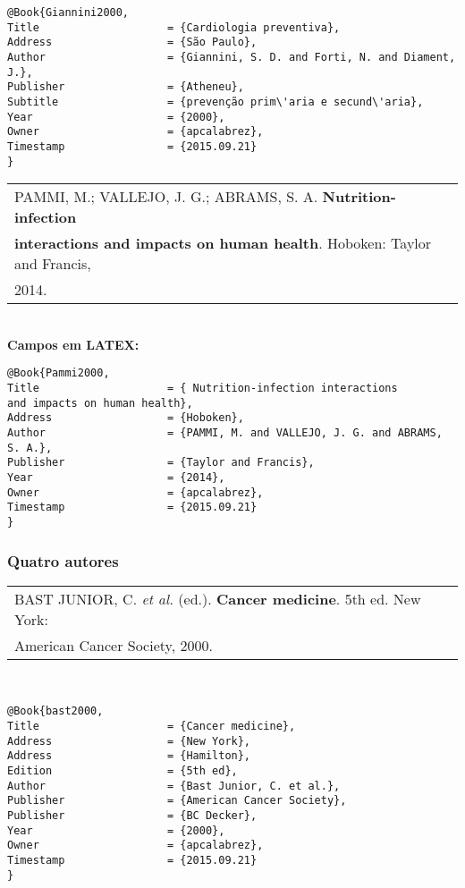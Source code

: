 \begin{verbatim}
@Book{Giannini2000,
Title                    = {Cardiologia preventiva},
Address                  = {São Paulo},
Author                   = {Giannini, S. D. and Forti, N. and Diament, 
J.},
Publisher                = {Atheneu},
Subtitle                 = {prevenção prim\'aria e secund\'aria},
Year                     = {2000},
Owner                    = {apcalabrez},
Timestamp                = {2015.09.21}
}
\end{verbatim}

\begin{tabular}{|l|c|} \hline
PAMMI, M.; VALLEJO, J. G.; ABRAMS, S. A. \textbf{Nutrition-infection} \\ \textbf{interactions and impacts on human health}. Hoboken: Taylor and Francis, \\ 2014. \\\hline
\end{tabular}\\

\textbf{Campos em LATEX:}

\begin{verbatim}
@Book{Pammi2000,
Title                    = { Nutrition-infection interactions
and impacts on human health},
Address                  = {Hoboken},
Author                   = {PAMMI, M. and VALLEJO, J. G. and ABRAMS, 
S. A.},
Publisher                = {Taylor and Francis},
Year                     = {2014},
Owner                    = {apcalabrez},
Timestamp                = {2015.09.21}
}
\end{verbatim}

\subsubsection{Quatro autores}

\begin{tabular}{|l|c|} \hline
BAST JUNIOR, C. \textit{et al.} (ed.). \textbf{Cancer medicine}. 
5th ed.	New York: \\ American Cancer Society, 2000. 
\\\hline
\end{tabular}\\

\begin{verbatim}
@Book{bast2000,
Title                    = {Cancer medicine},
Address                  = {New York},
Address                  = {Hamilton},
Edition                  = {5th ed},
Author                   = {Bast Junior, C. et al.},
Publisher                = {American Cancer Society},
Publisher                = {BC Decker},
Year                     = {2000},
Owner                    = {apcalabrez},
Timestamp                = {2015.09.21}
}
\end{verbatim}

